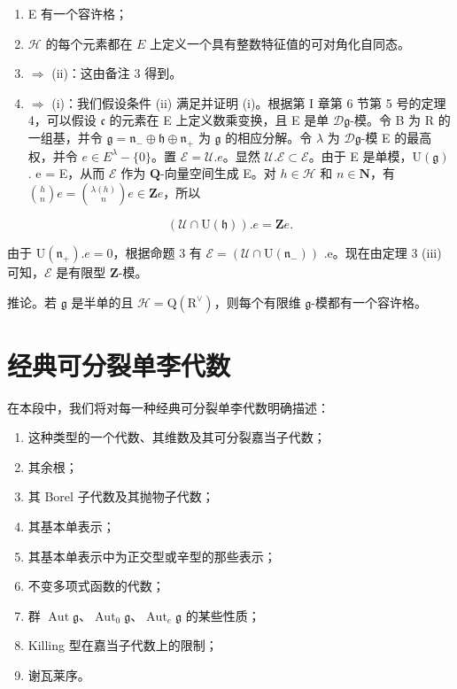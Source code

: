 \begin{enumerate}
\def\labelenumi{(\roman{enumi})}
\item
  E 有一个容许格；
\item
  \(\mathcal{H}\) 的每个元素都在 \(E\) 上定义一个具有整数特征值的可对角化自同态。
\item
  \(\Longrightarrow\) (ii)：这由备注 3 得到。
\item
  \(\Longrightarrow\) (i)：我们假设条件 (ii) 满足并证明 (i)。根据第 I 章第 6 节第 5 号的定理 4，可以假设 \(\mathfrak{c}\) 的元素在 E 上定义数乘变换，且 E 是单 \(\mathcal{D}\mathfrak{g}\)-模。令 B 为 \(\mathrm{R}\) 的一组基，并令 \(\mathfrak{g} = \mathfrak{n}_{-} \oplus \mathfrak{h} \oplus \mathfrak{n}_{+}\) 为 \(\mathfrak{g}\) 的相应分解。令 \(\lambda\) 为 \(\mathcal{D}\mathfrak{g}\)-模 E 的最高权，并令 \(e \in E^{\lambda} - \{0\}\)。置 \(\mathcal{E} = \mathcal{U}.e\)。显然 \(\mathcal{U}.\mathcal{E} \subset \mathcal{E}\)。由于 E 是单模，\(\mathrm{U}(\mathfrak{g})\) . e = E，从而 \(\mathcal{E}\) 作为 \(\mathbf{Q}\)-向量空间生成 E。对 \(h \in \mathcal{H}\) 和 \(n \in \mathbf{N}\)，有 \(\binom{h}{n} e = \binom{\lambda(h)}{n} e \in \mathbf{Z} e\)，所以
\end{enumerate}

\[
(\mathcal {U} \cap \mathrm{U} (\mathfrak {h})). e = \mathbf {Z}   e.
\]

由于 \(\mathrm{U}(\mathfrak{n}_{+}).e=0\)，根据命题 3 有 \(\mathcal{E}=(\mathcal{U}\cap\mathrm{U}(\mathfrak{n}_{-}))\) .e。现在由定理 3 (iii) 可知，\(\mathcal{E}\) 是有限型 \(\mathbf{Z}\)-模。

推论。若 \(\mathfrak{g}\) 是半单的且 \(\mathcal{H}=\mathrm{Q}(\mathrm{R}^{\vee})\)，则每个有限维 \(\mathfrak{g}\)-模都有一个容许格。

\section{经典可分裂单李代数}

在本段中，我们将对每一种经典可分裂单李代数明确描述：

\begin{enumerate}
\def\labelenumi{(\Roman{enumi})}
\item
  这种类型的一个代数、其维数及其可分裂嘉当子代数；
\item
  其余根；
\item
  其 Borel 子代数及其抛物子代数；
\item
  其基本单表示；
\item
  其基本单表示中为正交型或辛型的那些表示；
\item
  不变多项式函数的代数；
\item
  群 \(\operatorname{Aut} \mathfrak{g}\)、\(\operatorname{Aut}_0 \mathfrak{g}\)、\(\operatorname{Aut}_e \mathfrak{g}\) 的某些性质；
\item
  Killing 型在嘉当子代数上的限制；
\item
  谢瓦莱序。
\end{enumerate}

